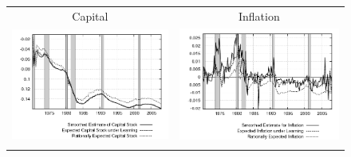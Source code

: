 \begin{figure}
\begin{tabular}{cc}
Capital & Inflation \\
\includegraphics[scale=0.52]{results_wlsinit/capital_exp.png} & 
\includegraphics[scale=0.52]{results_wlsinit/inflation_exp.png} \\ \\ 
 
\end{tabular}
\end{figure}
